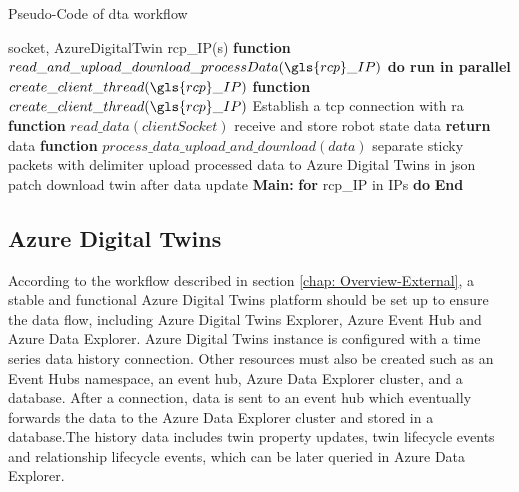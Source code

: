 \begin{breakablealgorithm}
    \caption{Pseudo-Code of \gls{dta} workflow}
    \label{alg:DTAgentPseudoCode}
    \begin{algorithmic}
     socket, AzureDigitalTwin
     \gls{rcp}\_IP(s)
    \State \textbf{function} {$read\_and\_upload\_download\_processData(\gls{rcp}\_IP)$}
        \State \qquad \textbf{do run in parallel}
            \State \qquad \qquad $create\_client\_thread(\gls{rcp}\_IP)$       
    \State \textbf{function} {$create\_client\_thread(\gls{rcp}\_IP)$}
        \State \qquad Establish a \gls{tcp} connection with \gls{ra}
        \State {}  
        \State {}    
    \State \textbf{function} {$read\_data(clientSocket)$}
        \State \qquad receive and store robot state data
        \State \qquad \textbf{return} data
    \State \textbf{function} {$process\_data\_upload\_and\_download(data)$}
        \State \qquad separate sticky packets with delimiter
        \State \qquad upload processed data to Azure Digital Twins in json patch
        \State \qquad download twin after data update 
    \State \textbf{Main:}
        \State \qquad \textbf{for} \gls{rcp}\_IP in IPs \textbf{do}
        \State \qquad {}
        \State \textbf{End}
    \end{algorithmic}
\end{breakablealgorithm}



\subsection{Azure Digital Twins}
According to the workflow described in section \ref{chap: Overview-External}, 
a stable and functional Azure Digital Twins platform should be set up to ensure
the data flow, including Azure Digital Twins Explorer, Azure Event Hub and Azure
Data Explorer. Azure Digital Twins instance is configured with a time series data 
history connection. Other resources must also be created such as an Event Hubs 
namespace, an event hub, Azure Data Explorer cluster, and a database. 
After a connection, data is sent to an event hub which eventually forwards 
the data to the Azure Data Explorer cluster and stored in a database.The history 
data includes twin property updates, twin lifecycle events and relationship lifecycle 
events, which can be later queried in Azure Data Explorer.

